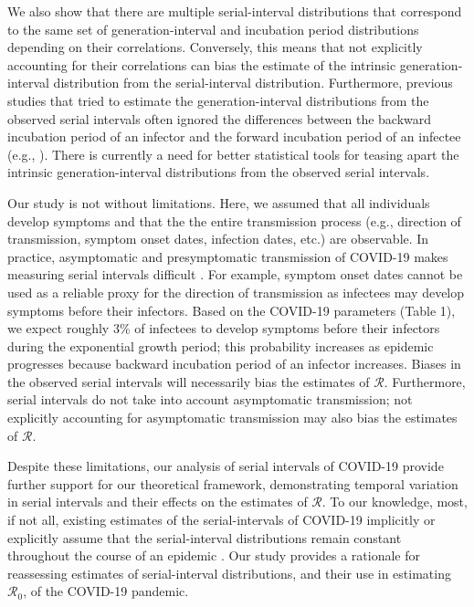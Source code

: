 \documentclass[12pt]{article}
\newcommand{\Rx}[1]{\ensuremath{{\mathcal R}_{#1}}\xspace}
\newcommand{\Ro}{\Rx{0}}
\newcommand{\RR}{\ensuremath{{\mathcal R}}\xspace}
\begin{document}
We also show that there are multiple serial-interval distributions that correspond to the same set of generation-interval and incubation period distributions depending on their correlations.
Conversely, this means that not explicitly accounting for their correlations can bias the estimate of the intrinsic generation-interval distribution from the serial-interval distribution.
Furthermore, previous studies that tried to estimate the generation-interval distributions from the observed serial intervals often ignored the differences between the backward incubation period of an infector and the forward incubation period of an infectee (e.g., \cite{klinkenberg2011correlation, ganyani2020estimating}).
There is currently a need for better statistical tools for teasing apart the intrinsic generation-interval distributions from the observed serial intervals.

Our study is not without limitations.
Here, we assumed that all individuals develop symptoms and that the the entire transmission process (e.g., direction of transmission, symptom onset dates, infection dates, etc.) are observable.
In practice, asymptomatic and presymptomatic transmission of COVID-19 makes measuring serial intervals difficult \citep{bai2020presumed,he2020temporal,wei2020presymptomatic}.
For example, symptom onset dates cannot be used as a reliable proxy for the direction of transmission as infectees may develop symptoms before their infectors.
Based on the COVID-19 parameters (Table 1), we expect roughly 3\% of infectees to develop symptoms before their infectors during the exponential growth period; 
this probability increases as epidemic progresses because backward incubation period of an infector increases.
Biases in the observed serial intervals will necessarily bias the estimates of \RR. 
Furthermore, serial intervals do not take into account asymptomatic transmission; 
not explicitly accounting for asymptomatic transmission may also bias the estimates of \RR \citep{park2020time}.

Despite these limitations, our analysis of serial intervals of COVID-19 provide further support for our theoretical framework, demonstrating temporal variation in serial intervals and their effects on the estimates of \RR.
To our knowledge, most, if not all, existing estimates of the serial-intervals of COVID-19 implicitly or explicitly assume that the serial-interval distributions remain constant throughout the course of an epidemic \citep{du2020serial, he2020temporal, nishiura2020serial,tindale2020transmission,zhao2020estimating,zhang2020evolving}.
Our study provides a rationale for reassessing estimates of serial-interval distributions, and their use in estimating \Ro, of the COVID-19 pandemic.
\end{document}
